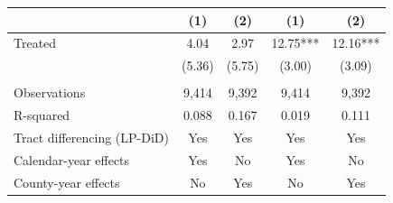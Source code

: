 \begin{table}[H]
{\begin{tabular}{lcccc}
 & (1) & (2) & (1) & (2) \\
\midrule
    Treated & 4.04 & 2.97 & 12.75*** & 12.16*** \\
 & (5.36) & (5.75) & (3.00) & (3.09) \\
 & & & & \\
    Observations & 9,414 & 9,392 & 9,414 & 9,392 \\
    R-squared & 0.088 & 0.167 & 0.019 & 0.111 \\
    Tract differencing (LP-DiD) & Yes & Yes & Yes & Yes \\
    Calendar-year effects & Yes & No & Yes & No \\
    County-year effects & No & Yes & No & Yes \\
\midrule\bottomrule
\end{tabular}
}
\label{tab:controls_robustness}
\end{table}
